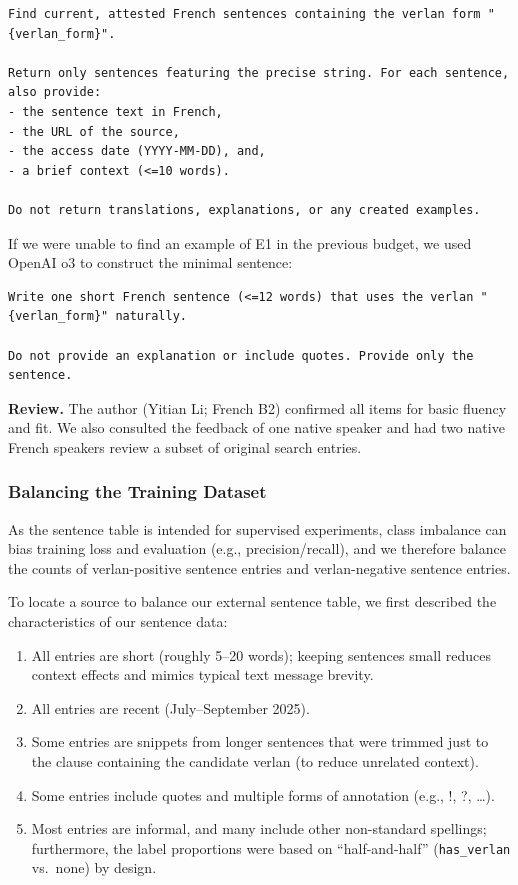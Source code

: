 \documentclass[12pt]{article}
\begin{document}
\begin{lstlisting}
Find current, attested French sentences containing the verlan form "{verlan_form}".

Return only sentences featuring the precise string. For each sentence, also provide:
- the sentence text in French,
- the URL of the source,
- the access date (YYYY-MM-DD), and,
- a brief context (<=10 words).

Do not return translations, explanations, or any created examples.
\end{lstlisting}

If we were unable to find an example of E1 in the previous budget, we used OpenAI o3 to construct the minimal sentence:

\begin{lstlisting}
Write one short French sentence (<=12 words) that uses the verlan "{verlan_form}" naturally.

Do not provide an explanation or include quotes. Provide only the sentence.
\end{lstlisting}

\textbf{Review.} The author (Yitian Li; French B2) confirmed all items for basic fluency and fit. We also consulted the feedback of one native speaker and had two native French speakers review a subset of original search entries.

\subsubsection{Balancing the Training Dataset}

As the sentence table is intended for supervised experiments, class imbalance can bias training loss and evaluation (e.g., precision/recall), and we therefore balance the counts of verlan-positive sentence entries and verlan-negative sentence entries.

To locate a source to balance our external sentence table, we first described the characteristics of our sentence data:
\begin{enumerate}
  \item All entries are short (roughly 5--20 words); keeping sentences small reduces context effects and mimics typical text message brevity.
  \item All entries are recent (July--September 2025).
  \item Some entries are snippets from longer sentences that were trimmed just to the clause containing the candidate verlan (to reduce unrelated context).
  \item Some entries include quotes and multiple forms of annotation (e.g., !, ?, \ldots).
  \item Most entries are informal, and many include other non-standard spellings; furthermore, the label proportions were based on ``half-and-half'' (\texttt{has\_verlan} vs.\ none) by design.
\end{enumerate}
\end{document}

